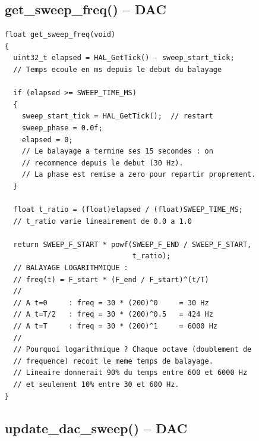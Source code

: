 \documentclass[a4paper,11pt]{article}
\begin{document}
\subsection{get\_sweep\_freq() -- DAC}

\begin{lstlisting}[style=cstyle,caption={Calcul de la fr\'equence instantan\'ee du balayage}]
float get_sweep_freq(void)
{
  uint32_t elapsed = HAL_GetTick() - sweep_start_tick;
  // Temps ecoule en ms depuis le debut du balayage

  if (elapsed >= SWEEP_TIME_MS)
  {
    sweep_start_tick = HAL_GetTick();  // restart
    sweep_phase = 0.0f;
    elapsed = 0;
    // Le balayage a termine ses 15 secondes : on
    // recommence depuis le debut (30 Hz).
    // La phase est remise a zero pour repartir proprement.
  }

  float t_ratio = (float)elapsed / (float)SWEEP_TIME_MS;
  // t_ratio varie lineairement de 0.0 a 1.0

  return SWEEP_F_START * powf(SWEEP_F_END / SWEEP_F_START,
                              t_ratio);
  // BALAYAGE LOGARITHMIQUE :
  // freq(t) = F_start * (F_end / F_start)^(t/T)
  //
  // A t=0     : freq = 30 * (200)^0     = 30 Hz
  // A t=T/2   : freq = 30 * (200)^0.5   = 424 Hz
  // A t=T     : freq = 30 * (200)^1     = 6000 Hz
  //
  // Pourquoi logarithmique ? Chaque octave (doublement de
  // frequence) recoit le meme temps de balayage.
  // Lineaire donnerait 90% du temps entre 600 et 6000 Hz
  // et seulement 10% entre 30 et 600 Hz.
}
\end{lstlisting}

\subsection{update\_dac\_sweep() -- DAC}
\end{document}
